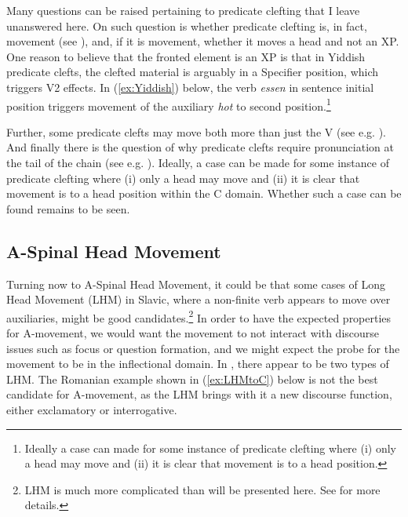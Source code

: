\documentclass[output=paper,colorlinks,citecolor=brown,
]{langscibook}
\begin{document}
Many questions can be raised pertaining to predicate clefting that I leave unanswered here.  On such question is whether predicate clefting is, in fact, movement (see \citealt{Cable:2004}), and, if it is movement, whether it moves a head and not an XP.  One reason to believe that the fronted element is an XP is that in Yiddish predicate clefts, the clefted material is arguably in a Specifier position, which triggers V2 effects.  In (\ref{ex:Yiddish}) below, the verb \textit{essen} in sentence initial position triggers movement of the auxiliary \textit{hot} to second position.\footnote{Ideally a case can made for some instance of predicate clefting where (i) only a head may move and (ii) it is clear that movement is to a head position.}

\z

Further, some predicate clefts may move both more than just the V (see e.g. \citet{Vicente:2009}).  And finally there is the question of why predicate clefts require pronunciation at the tail of the chain (see e.g. \citealt{Trinh:2009}).  Ideally, a case can be made for some instance of predicate clefting where (i) only a head may move and (ii) it is clear that movement is to a head position within the C domain.  Whether such a case can be found remains to be seen.

\subsection{A-Spinal Head Movement}

Turning now to A-Spinal Head Movement, it could be that some cases of Long Head Movement (LHM) in Slavic, where a non-finite verb appears to move over auxiliaries, might be good candidates.\footnote{LHM is much more complicated than will be presented here.  See \citet{Harizanov:2018,Lema:1989,Rivero:1991a,Rivero:1994,Roberts:2010} for more details.}  In order to have  the expected properties for A-movement, we would want the movement to  not interact with discourse issues such as focus or question formation, and we might expect the probe for the movement to be in the inflectional domain.  In \citet{Rivero:1994}, there appear to be two types of LHM.  The Romanian example shown in (\ref{ex:LHMtoC}) below is not the best candidate for A-movement, as the LHM brings with it a new discourse function, either exclamatory or interrogative.
\end{document}
